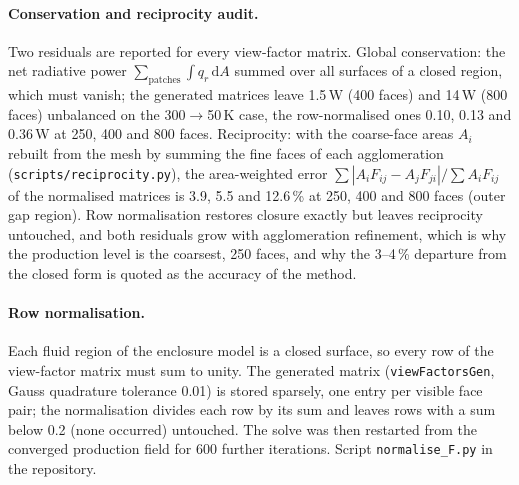 \documentclass[11pt]{article}
\begin{document}
\paragraph{Conservation and reciprocity audit.} Two residuals are reported for every view-factor
matrix. Global conservation: the net radiative power $\sum_{\mathrm{patches}}\int q_r\,\mathrm dA$
summed over all surfaces of a closed region, which must vanish; the generated matrices leave 1.5\,W
(400 faces) and 14\,W (800 faces) unbalanced on the 300$\to$50\,K case, the row-normalised ones
0.10, 0.13 and 0.36\,W at 250, 400 and 800 faces. Reciprocity: with the coarse-face areas $A_i$
rebuilt from the mesh by summing the fine faces of each agglomeration
(\texttt{scripts/reciprocity.py}), the area-weighted error $\sum|A_iF_{ij}-A_jF_{ji}|/\sum A_iF_{ij}$
of the normalised matrices is 3.9, 5.5 and 12.6\,\% at 250, 400 and 800 faces (outer gap region).
Row normalisation restores closure exactly but leaves reciprocity untouched, and both residuals grow
with agglomeration refinement, which is why the production level is the coarsest, 250 faces, and why
the 3--4\,\% departure from the closed form is quoted as the accuracy of the method.

\paragraph{Row normalisation.} Each fluid region of the enclosure model is a closed surface, so
every row of the view-factor matrix must sum to unity. The generated matrix (\texttt{viewFactorsGen},
Gauss quadrature tolerance 0.01) is stored sparsely, one entry per visible face pair; the
normalisation divides each row by its sum and leaves rows with a sum below 0.2 (none occurred)
untouched. The solve was then restarted from the converged production field for 600 further
iterations. Script \texttt{normalise\_F.py} in the repository.
\end{document}
